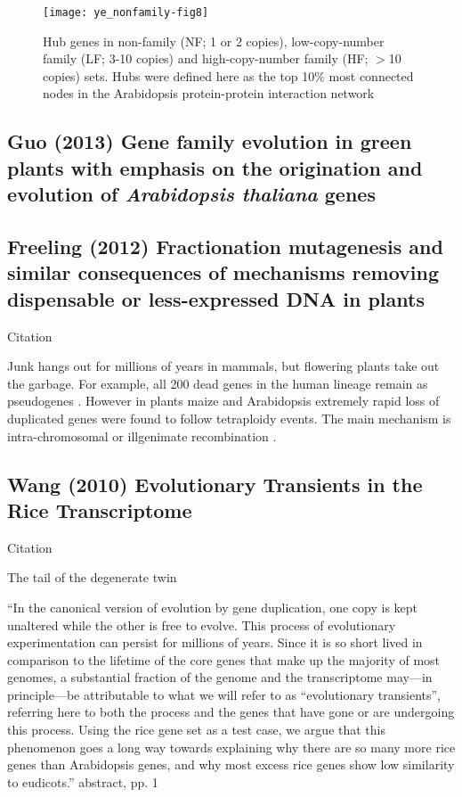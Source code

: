     \begin{figure}[h!] \centering \texttt{[image: ye\_nonfamily-fig8]}
        \caption{ Hub genes in non-family (NF; 1 or 2 copies),
            low-copy-number family (LF; 3-10 copies) and high-copy-number
            family (HF; $>$10 copies) sets. Hubs were defined here as the
            top 10\% most connected nodes in the Arabidopsis
        protein-protein interaction network } \end{figure} \FloatBarrier

\subsection{Guo (2013) Gene family evolution in green plants with emphasis
    on the origination and evolution of \textit{Arabidopsis thaliana}
genes}

\subsection{Freeling (2012) Fractionation mutagenesis and similar consequences
    of mechanisms removing dispensable or less-expressed {DNA} in plants}

    Citation \cite{freeling_fractionation_2012}

    Junk hangs out for millions of years in mammals, but flowering plants take
    out the garbage. For example, all 200 dead genes in the human lineage
    remain as pseudogenes \cite{schrider_all_2009}. However in plants maize
    \cite{woodhouse_following_2010} and Arabidopsis
    \cite{thomas_following_2006} extremely rapid loss of duplicated genes were
    found to follow tetraploidy events. The main mechanism is intra-chromosomal
    or illgenimate recombination \cite{woodhouse_following_2010}.

\subsection{Wang (2010) Evolutionary Transients in the Rice Transcriptome}

    Citation \cite{wang_evolutionary_2010}

    The tail of the degenerate twin

    ``In the canonical version of evolution by gene duplication, one copy
    is kept unaltered while the other is free to evolve. This process of
    evolutionary experimentation can persist for millions of years. Since
    it is so short lived in comparison to the lifetime of the core genes
    that make up the majority of most genomes, a substantial fraction of
    the genome and the transcriptome may—in principle—be attributable to
    what we will refer to as “evolutionary transients”, referring here to
    both the process and the genes that have gone or are undergoing this
    process. Using the rice gene set as a test case, we argue that this
    phenomenon goes a long way towards explaining why there are so many
    more rice genes than Arabidopsis genes, and why most excess rice genes
    show low similarity to eudicots.'' abstract, pp. 1

